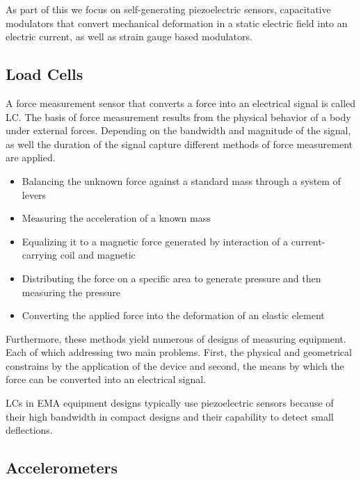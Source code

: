 As part of this we focus on self-generating piezoelectric sensors, capacitative modulators that convert mechanical deformation in a static electric field into an electric current, as well as strain gauge based modulators.

\subsection{Load Cells}

A force measurement sensor that converts a force into an electrical signal is called \acf{LC}. The basis of force measurement results from the physical behavior of a body under external forces. Depending on the bandwidth and magnitude of the signal, as well the duration of the signal capture different methods of force measurement are applied.

\begin{itemize}
    \item Balancing the unknown force against a standard mass through a system of levers
    \item Measuring the acceleration of a known mass
    \item Equalizing it to a magnetic force generated by interaction of a current-carrying coil and magnetic
    \item Distributing the force on a specific area to generate pressure and then measuring the pressure
    \item Converting the applied force into the deformation of an elastic element
\end{itemize}

Furthermore, these methods yield numerous of designs of measuring equipment. Each of which addressing two main problems. First, the physical and geometrical constrains by the application of the device and second, the means by which the force can be converted into an electrical signal.

\ac{LC}s in \ac{EMA} equipment designs typically use piezoelectric sensors because of their high bandwidth in compact designs and their capability to detect small deflections.

\subsection{Accelerometers}


